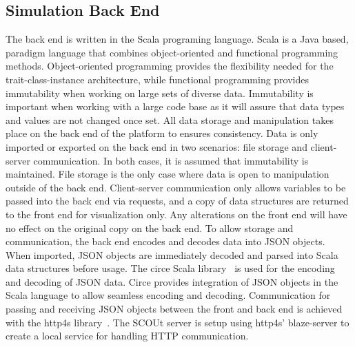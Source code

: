 \subsection{Simulation Back End} \label{subsec:back_end}
The back end is written in the Scala programing language.
Scala is a Java based, paradigm language that combines object-oriented and functional programming methods.
Object-oriented programming provides the flexibility needed for the trait-class-instance architecture, while functional programming provides immutability when working on large sets of diverse data.
Immutability is important when working with a large code base as it will assure that data types and values are not changed once set.
All data storage and manipulation takes place on the back end of the platform to ensures consistency.
Data is only imported or exported on the back end in two scenarios: file storage and client-server communication.
In both cases, it is assumed that immutability is maintained.
File storage is the only case where data is open to manipulation outside of the back end.
Client-server communication only allows variables to be passed into the back end via requests, and a copy of data structures are returned to the front end for visualization only.
Any alterations on the front end will have no effect on the original copy on the back end.
To allow storage and communication, the back end encodes and decodes data into JSON objects.
When imported, JSON objects are immediately decoded and parsed into Scala data structures before usage.
The circe Scala library~\cite{circe} is used for the encoding and decoding of JSON data.
Circe provides integration of JSON objects in the Scala language to allow seamless encoding and decoding.
Communication for passing and receiving JSON objects between the front and back end is achieved with the http4s library~\cite{http4s}.
The SCOUt server is setup using http4s' blaze-server to create a local service for handling HTTP communication.


